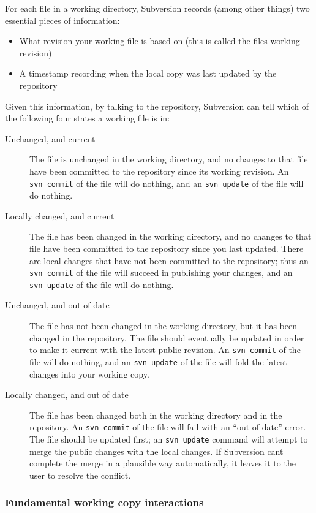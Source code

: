 For each file in a working directory, Subversion records (among other
things) two essential pieces of information:

\begin{itemize}
\item
  What revision your working file is based on (this is called the
  file\textquotesingle s working revision)
\item
  A timestamp recording when the local copy was last updated by the
  repository
\end{itemize}

Given this information, by talking to the repository, Subversion can
tell which of the following four states a working file is in:

\begin{description}
\item[Unchanged, and current]
The file is unchanged in the working directory, and no changes to that
file have been committed to the repository since its working revision.
An \texttt{svn\ commit} of the file will do nothing, and an
\texttt{svn\ update} of the file will do nothing.
\item[Locally changed, and current]
The file has been changed in the working directory, and no changes to
that file have been committed to the repository since you last updated.
There are local changes that have not been committed to the repository;
thus an \texttt{svn\ commit} of the file will succeed in publishing your
changes, and an \texttt{svn\ update} of the file will do nothing.
\item[Unchanged, and out of date]
The file has not been changed in the working directory, but it has been
changed in the repository. The file should eventually be updated in
order to make it current with the latest public revision. An
\texttt{svn\ commit} of the file will do nothing, and an
\texttt{svn\ update} of the file will fold the latest changes into your
working copy.
\item[Locally changed, and out of date]
The file has been changed both in the working directory and in the
repository. An \texttt{svn\ commit} of the file will fail with an
``out-of-date'' error. The file should be updated first; an
\texttt{svn\ update} command will attempt to merge the public changes
with the local changes. If Subversion can\textquotesingle t complete the
merge in a plausible way automatically, it leaves it to the user to
resolve the conflict.
\end{description}

\subsubsection{Fundamental working copy
interactions}\label{svn.basic.in-action.wc-funcdamentals}

